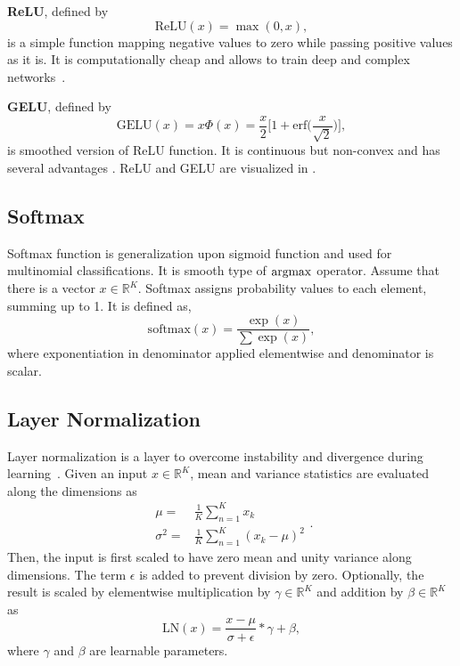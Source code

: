 \textbf{ReLU}, defined by
\begin{equation}
\label{eqn:relu_fcn}
\textrm{ReLU}(x) = \max(0, x),
\end{equation}
is a simple function mapping negative values to zero while passing positive values as it is. It is computationally cheap and allows to train deep and complex networks~\cite{glorot_deep_2011}.

\textbf{GELU}, defined by
\begin{equation}
\label{eqn:gelu_fcn}
\textrm{GELU}(x) = x \Phi(x) = \frac{x}{2} \bigg[ 1 + \textrm{erf} \Big( \frac{x}{\sqrt{2}} \Big) \bigg],
\end{equation}
is smoothed version of ReLU function. It is continuous but non-convex and has several advantages \cite{hendrycks_gaussian_2020}. ReLU and GELU are visualized in  . 

\subsection{Softmax}

Softmax function is generalization upon sigmoid function and used for multinomial classifications. It is smooth type of $\operatorname{\textup{argmax}}$ operator. Assume that there is a vector $x \in \mathbb{R}^K$. Softmax assigns probability values to each element, summing up to 1. It is defined as,
\begin{equation}
\label{eqn:softmax_fcn}
\text{softmax}(x) = \frac{\exp(x)}{\sum \exp(x)},
\end{equation}
where exponentiation in denominator applied elementwise and denominator is scalar.

\subsection{Layer Normalization}

Layer normalization is a layer to overcome instability and divergence during learning~\cite{ba_layer_2016}. 
Given an input $x \in \mathbb{R}^K$, mean and variance statistics are evaluated along the dimensions as  
\begin{equation}
\label{eq:layernorm_statistics}
\begin{split}
\mu = & \frac{1}{K} \sum_{n=1}^{K} x_k \\
\sigma^2 = & \frac{1}{K} \sum_{n=1}^{K} (x_k-\mu)^2
\end{split}.
\end{equation} 
Then, the input is first scaled to have zero mean and unity variance along dimensions. 
The term $\epsilon$ is added to prevent division by zero. 
Optionally, the result is scaled by elementwise multiplication by $\gamma \in \mathbb{R}^K$ and addition by $\beta \in \mathbb{R}^K$ as
\begin{equation}
\label{eqn:layernorm}
\mathrm{LN}(x) = \frac{x-\mu}{\sigma+\epsilon} * \gamma + \beta,
\end{equation}
where $\gamma$ and $\beta$ are learnable parameters. 
